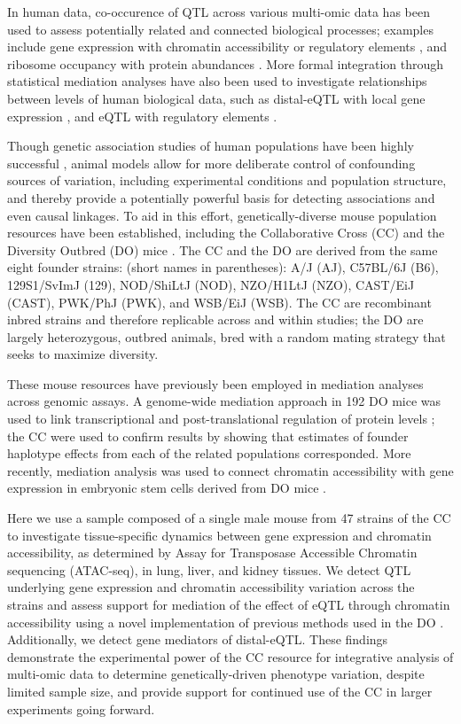 \documentclass[10pt,letterpaper]{article}
\begin{document}
In human data, co-occurence of QTL across various multi-omic data has been used to assess potentially related and connected biological processes; examples include gene expression with chromatin accessibility \cite{Degner2012} or regulatory elements \cite{Pai2015},  and ribosome occupancy with protein abundances \cite{Battle2015, Yang2017}.
More formal integration through statistical mediation analyses have also been used to investigate relationships between levels of human biological data, such as distal-eQTL with local gene expression \cite{Battle2014}, and eQTL with regulatory elements \cite{Alasoo2017, Roytman2018, Wu2018}.

Though genetic association studies of human populations have been highly successful \cite{Visscher2017}, animal models allow for more deliberate control of confounding sources of variation, including experimental conditions and population structure, and thereby provide a potentially powerful basis for detecting associations and even causal linkages.
To aid in this effort, genetically-diverse mouse population resources have been established, including the Collaborative Cross (CC) \cite{Churchill2004,Hall2012,Srivastava2017} and the Diversity Outbred (DO) mice \cite{Churchill2012}. The CC and the DO are derived from the same eight founder strains: (short names in parentheses): A/J (AJ), C57BL/6J (B6), 129S1/SvImJ (129), NOD/ShiLtJ (NOD), NZO/H1LtJ (NZO), CAST/EiJ (CAST), PWK/PhJ (PWK), and WSB/EiJ (WSB). The CC are recombinant inbred strains and therefore replicable across and within studies; the DO are largely heterozygous, outbred animals, bred with a random mating strategy that seeks to maximize diversity. 

These mouse resources have previously been employed in mediation analyses across genomic assays. A genome-wide mediation approach in 192 DO mice was used to link transcriptional and post-translational regulation of protein levels \cite{Chick2016}; the CC were used to confirm results by showing that estimates of founder haplotype effects from each of the related populations corresponded. More recently, mediation analysis was used to connect chromatin accessibility with gene expression in embryonic stem cells derived from DO mice \cite{Skelly2019}.

Here we use a sample composed of a single male mouse from 47 strains of the CC to investigate tissue-specific dynamics between gene expression and  chromatin accessibility, as determined by Assay for Transposase Accessible Chromatin sequencing (ATAC-seq), in lung, liver, and kidney tissues. We detect QTL underlying gene expression and chromatin accessibility variation across the strains and assess support for mediation of the effect of eQTL through chromatin accessibility using a novel implementation of previous methods used in the DO \cite{Chick2016}. Additionally, we detect gene mediators of distal-eQTL. 
These findings demonstrate the experimental power of the CC resource for integrative analysis of multi-omic data to determine genetically-driven phenotype variation, despite limited sample size, and provide support for continued use of the CC in larger experiments going forward.
\end{document}
